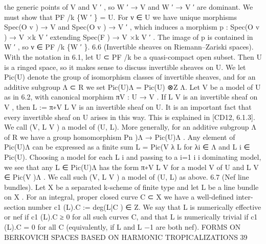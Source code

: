 \documentclass[
  10pt,
]{article}
\newenvironment{Shaded}{}{}
\newcommand{\NormalTok}[1]{#1}
\begin{document}
\begin{Shaded}
\begin{Highlighting}[]
\NormalTok{the generic points of V and V ′ , so W ′ → V and W ′ → V ′ are dominant. We must show that}
\NormalTok{PF /k \{W ′ \} = U. For ν ∈ U we have unique morphisms Spec(O v ) → V and Spec(O v ) → V ′ ,}
\NormalTok{which induces a morphism p : Spec(O v ) → V ×k V ′ extending Spec(F ) → V ×k V ′ . The}
\NormalTok{image of p is contained in W ′ , so ν ∈ PF /k \{W ′ \}.                                     }
\NormalTok{6.6 (Invertible sheaves on Riemann–Zariski spaces). With the notation in 6.1, let U ⊂}
\NormalTok{PF /k be a quasi{-}compact open subset. Then U is a ringed space, so it makes sense to}
\NormalTok{discuss invertible sheaves on U. We let Pic(U) denote the group of isomorphism classes}
\NormalTok{of invertible sheaves, and for an additive subgroup Λ ⊂ R we set Pic(U)Λ = Pic(U) ⊗Z Λ.}
\NormalTok{   Let V be a model of U as in 6.2, with canonical morphism πV : U → V . If L V is an}
\NormalTok{invertible sheaf on V , then L := π∗V L V is an invertible sheaf on U. It is an important fact}
\NormalTok{that every invertible sheaf on U arises in this way. This is explained in [CD12, 6.1.3]. We}
\NormalTok{call (V, L V ) a model of (U, L).}
\NormalTok{   More generally, for an additive subgroup Λ of R we have a group homomorphism}
\NormalTok{Pn )Λ → Pic(U)Λ . Any element of Pic(U)Λ can be expressed as a finite sum L =}
\NormalTok{Pic(V}
\NormalTok{      λ L for λi ∈ Λ and L i ∈ Pic(U). Choosing a model for each L i and passing to a}
\NormalTok{   i=1 i i}
\NormalTok{dominating model, we see that any L ∈ Pic(U)Λ has the form π∗V L V for a model V of U}
\NormalTok{and L V ∈ Pic(V )Λ . We call such (V, L V ) a model of (U, L) as above.}
\NormalTok{6.7 (Nef line bundles). Let X be a separated k{-}scheme of finite type and let L be a line}
\NormalTok{bundle on X . For an integral, proper closed curve C ⊂ X we have a well{-}defined inter{-}}
\NormalTok{section number c1 (L).C := deg(L|C ) ∈ Z. We say that L is numerically effective or nef if}
\NormalTok{c1 (L).C ≥ 0 for all such curves C, and that L is numerically trivial if c1 (L).C = 0 for all C}
\NormalTok{(equivalently, if L and L −1 are both nef).}
\NormalTok{               FORMS ON BERKOVICH SPACES BASED ON HARMONIC TROPICALIZATIONS                     39}


\end{Highlighting}
\end{Shaded}
\end{document}
